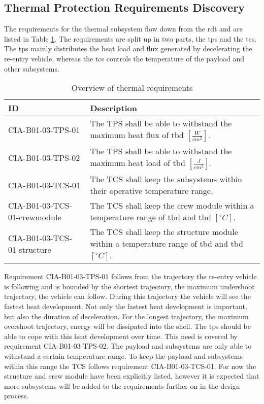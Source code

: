 \subsection{Thermal Protection Requirements Discovery} \label{sec:therm}
The requirements for the thermal subsystem flow down from the \gls{rdt} and are listed in Table \ref{tab:thermalreq}. The requirements are split up in two parts, the \gls{tps} and the \gls{tcs}. The \gls{tps} mainly distributes the heat load and flux generated by decelerating the re-entry vehicle, whereas the \gls{tcs} controls the temperature of the payload and other subsystems.


\begin{table}[H]
	\caption{Overview of thermal requirements}
	\begin{tabular}{|p{}|p{}|}
    \hline
    ID          & Description                                                                                                      \\ \hline \hline
    CIA-B01-03-TPS-01 & The TPS shall be able to withstand the maximum heat flux of \gls{tbd} $ \left[\frac{W}{cm^2}\right] $.               
\\ \hline
    CIA-B01-03-TPS-02 &  The TPS shall be able to withstand the maximum heat load of \gls{tbd} $ \left[\frac{J}{cm^2}\right] $.                
\\ \hline
    CIA-B01-03-TCS-01 & The TCS shall keep the subsystems within their operative temperature range.                                            
\\ \hline
    CIA-B01-03-TCS-01-crewmodule & The TCS shall keep the crew module within a temperature range of \gls{tbd} and \gls{tbd} $ \left[^{\circ}C\right] $.                                        
\\ \hline
    CIA-B01-03-TCS-01-structure & The TCS shall keep the structure module within a temperature range of \gls{tbd} and \gls{tbd} $ \left[^{\circ}C\right] $.                                        
\\ \hline

    \end{tabular}
    \label{tab:thermalreq}
\end{table}

Requirement CIA-B01-03-TPS-01 follows from the trajectory the re-entry vehicle is following and is bounded by the shortest trajectory, the maximum undershoot trajectory, the vehicle can follow. During this trajectory the vehicle will see the fastest heat development. Not only the fastest heat development is important, but also the duration of deceleration. For the longest trajectory, the maximum overshoot trajectory, energy will be dissipated into the shell. The \gls{tps} should be able to cope with this heat development over time. This need is covered by requirement CIA-B01-03-TPS-02. The payload and subsystems are only able to withstand a certain temperature range. To keep the payload and subsystems within this range the TCS follows requirement CIA-B01-03-TCS-01. For now the structure and crew module have been explicitly listed, however it is expected that more subsystems will be added to the requirements further on in the design process.

